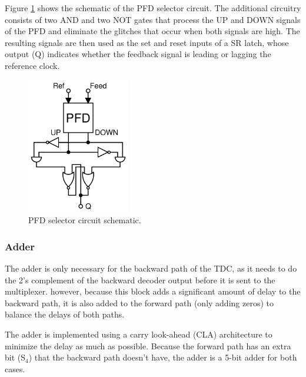 Figure \ref{fig:PFD_selector} shows the schematic of the PFD selector circuit. The additional circuitry consists of two AND and two NOT gates that process the UP and DOWN signals of the PFD and eliminate the
glitches that occur when both signals are high. The resulting signals are then used as the set and reset inputs of a SR latch, whose output (Q) indicates whether the feedback signal is leading or lagging the
reference clock.

\begin{figure}[H]
    \centering
    \includegraphics[width=0.4\textwidth]{figures/PFD_selector.png}
    \caption{PFD selector circuit schematic.}
    \label{fig:PFD_selector}
\end{figure}

\subsubsection{Adder}
The adder is only necessary for the backward path of the TDC, as it needs to do the 2's complement of the backward decoder output before it is sent to the multiplexer. however, because this block adds a significant 
amount of delay to the backward path, it is also added to the forward path (only adding zeros) to balance the delays of both paths.

The adder is implemented using a carry look-ahead (CLA) architecture to minimize the delay as much as possible. Because the forward path has an extra bit (S$_4$) that the backward path doesn't have, the adder is a
5-bit adder for both cases.


